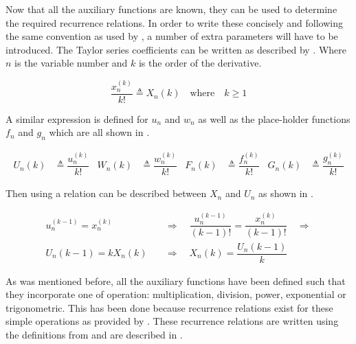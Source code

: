 Now that all the auxiliary functions are known, they can be used to determine the required recurrence relations. In order to write these concisely and following the same convention as used by \cite{scott2008high}, a number of extra parameters will have to be introduced. The Taylor series coefficients can be written as described by . Where $n$ is the variable number and $k$ is the order of the derivative.

\begin{equation} \label{eq:tsCoeff}
\dfrac{x_{n}^{\left(k\right)}}{k!} \triangleq X_{n}\left(k\right) \quad \text{where} \quad k \geq 1
\end{equation}

A similar expression is defined for $u_{n}$ and $w_{n}$ as well as the place-holder functions $f_{n}$ and $g_{n}$ which are all shown in .

\begin{align} \label{eq:redDer}
U_{n}\left(k\right)& \triangleq \dfrac{u_{n}^{\left(k\right)}}{k!}
&
W_{n}\left(k\right)& \triangleq \dfrac{w_{n}^{\left(k\right)}}{k!}
&
F_{n}\left(k\right)& \triangleq \dfrac{f_{n}^{\left(k\right)}}{k!}
&
G_{n}\left(k\right)& \triangleq \dfrac{g_{n}^{\left(k\right)}}{k!}
\end{align}



Then using  a relation can be described between $X_{n}$ and $U_{n}$ as shown in  \citep{scott2008high}. 

\begin{equation} \label{eq:UnXn}
\begin{split}
u_{n}^{\left( k-1\right)}=x_{n}^{\left( k\right)} \quad &\Rightarrow \quad \dfrac{u_{n}^{\left( k-1\right)}}{\left(k-1\right)!} = \dfrac{x_{n}^{\left( k\right)}}{\left(k-1\right)!} \quad \Rightarrow\\
U_{n}\left(k-1\right)=kX_{n}\left(k\right) \quad &\Rightarrow \quad X_{n}\left(k\right)=\dfrac{U_{n}\left(k-1\right)}{k}
\end{split}
\end{equation}

As was mentioned before, all the auxiliary functions have been defined such that they incorporate one of operation: multiplication, division, power, exponential or trigonometric. This has been done because recurrence relations exist for these simple operations as provided by \cite{jorba2005software}. These recurrence relations are written using the definitions from  and are described in .

